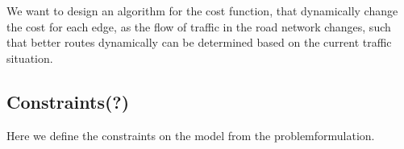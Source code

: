 We want to design an algorithm for the cost function, that dynamically change the cost for each edge, as the flow of traffic in the road network changes, such that better routes dynamically can be determined based on the current traffic situation.

\subsection*{Constraints(?)}
Here we define the constraints on the model from the problemformulation.